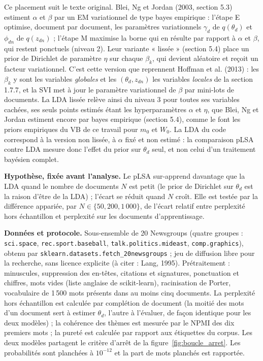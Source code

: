 Ce placement suit le texte original. Blei, Ng et Jordan (2003, section 5.3) estiment $\alpha$ et $\beta$ par un EM variationnel de type bayes empirique : l'étape E optimise, document par document, les paramètres variationnels $\gamma_d$ de $q(\theta_d)$ et $\phi_{dn}$ de $q(z_{dn})$ ; l'étape M maximise la borne qui en résulte par rapport à $\alpha$ et $\beta$, qui restent ponctuels (niveau 2). Leur variante « lissée » (section 5.4) place un prior de Dirichlet de paramètre $\eta$ sur chaque $\beta_k$, qui devient aléatoire et reçoit un facteur variationnel. C'est cette version que reprennent Hoffman et al. (2013) : les $\beta_k$ y sont les variables \emph{globales} et les $(\theta_d, z_{dn})$ les variables \emph{locales} de la section 1.7.7, et la SVI met à jour le paramètre variationnel de $\beta$ par mini-lots de documents. La LDA lissée relève ainsi du niveau 3 pour toutes ses variables cachées, ses seuls points estimés étant les hyperparamètres $\alpha$ et $\eta$, que Blei, Ng et Jordan estiment encore par bayes empirique (section 5.4), comme le font les priors empiriques du VB de ce travail pour $m_0$ et $W_0$. La LDA du code correspond à la version non lissée, à $\alpha$ fixé et non estimé : la comparaison pLSA contre LDA mesure donc l'effet du prior sur $\theta_d$ seul, et non celui d'un traitement bayésien complet.



\textbf{Hypothèse, fixée avant l'analyse. }Le pLSA sur-apprend davantage que la LDA quand le nombre de documents $N$ est petit (le prior de Dirichlet sur $\theta_d$ est la raison d'être de la LDA) ; l'écart se réduit quand $N$ croît. Elle est testée par la différence appariée, par $N \in \{50, 200, 1\,000\}$, de l'écart relatif entre perplexité hors échantillon et perplexité sur les documents d'apprentissage.

\textbf{Données et protocole. }Sous-ensemble de 20 Newsgroups (quatre groupes : \texttt{sci.space}, \texttt{rec.sport.baseball}, \texttt{talk.politics.mideast}, \texttt{comp.graphics}), obtenu par \texttt{sklearn.datasets.fetch\_20newsgroups} ; jeu de diffusion libre pour la recherche, sans licence explicite (à citer : Lang, 1995). Prétraitement : minuscules, suppression des en-têtes, citations et signatures, ponctuation et chiffres, mots vides (liste anglaise de scikit-learn), racinisation de Porter, vocabulaire de 1\,500 mots présents dans au moins cinq documents. La perplexité hors échantillon est calculée par complétion de document (la moitié des mots d'un document sert à estimer $\theta_d$, l'autre à l'évaluer, de façon identique pour les deux modèles) ; la cohérence des thèmes est mesurée par le NPMI des dix premiers mots ; la pureté est calculée par rapport aux étiquettes du corpus. Les deux modèles partagent le critère d'arrêt de la figure~\ref{fig:boucle_arret}. Les probabilités sont planchées à $10^{-12}$ et la part de mots planchés est rapportée.

